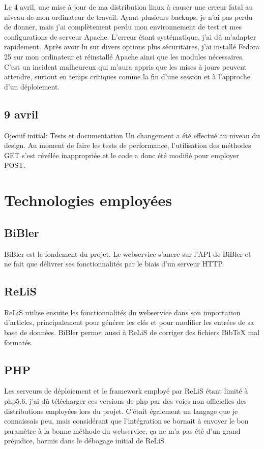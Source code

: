 \documentclass[a4paper,12pt,titlepage]{article}
\begin{document}
Le 4 avril, une mise à jour de ma distribution linux à causer une erreur fatal au niveau de mon ordinateur de travail. Ayant plusieurs backups, je n'ai pas perdu de donner, mais j'ai complètement perdu mon environnement de test et mes configurations de serveur Apache. L'erreur étant systématique, j'ai dû m'adapter rapidement. Après avoir lu sur divers options plus sécuritaires, j'ai installé Fedora 25 sur mon ordinateur et réinstallé Apache ainsi que les modules nécessaires. C'est un incident malheureux qui m'aura appris que les mises à jours peuvent attendre, surtout en temps critiques comme la fin d'une session et à l'approche d'un déploiement.

\subsection{9 avril}
Ojectif initial: Tests et documentation \newline
Un changement a été effectué au niveau du design. Au moment de faire les tests de performance, l'utilisation des méthodes GET s'est révélée inappropriée et le code a donc été modifié pour employer POST.


\section{Technologies employées}
\subsection{BiBler}
BiBler est le fondement du projet. Le webservice s'ancre sur l'API de BiBler et ne fait que délivrer ses fonctionnalités par le biais d'un serveur HTTP. 
\subsection{ReLiS}
ReLiS utilise ensuite les fonctionnalités du webservice dans son importation d'articles, principalement pour générer les clés et pour modifier les entrées de sa base de données. BiBler permet aussi à ReLiS de corriger des fichiers BibTeX mal formatés.
\subsection{PHP}
Les serveurs de déploiement et le framework employé par ReLiS étant limité à php5.6, j'ai dû télécharger ces versions de php par des voies non officielles des distributions employées lors du projet. C'était également un langage que je connaissais peu, mais considérant que l'intégration se bornait à envoyer le bon paramètre à la bonne méthode du webservice, ça ne m'a pas été d'un grand préjudice, hormis dans le débogage initial de ReLiS.
\end{document}
